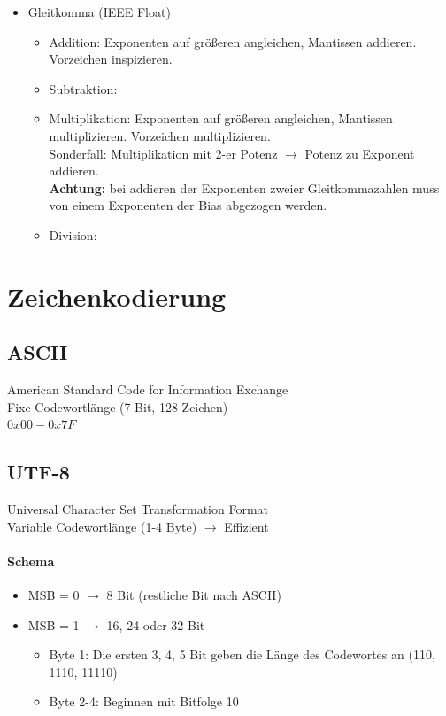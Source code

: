 \documentclass[6pt,a4paper]{scrartcl}
\renewcommand{\emph}[1]{\textsf{\textbf{#1}}}
\begin{document}
\begin{multicols*}{3}
\begin{itemize}
\begin{itemize}
\begin{enumerate}
		\end{enumerate}
	\end{itemize}
	\item Gleitkomma (IEEE Float)
	\begin{itemize}
		\item Addition: Exponenten auf größeren angleichen, Mantissen addieren. Vorzeichen inspizieren.\\
		\item Subtraktion:
		\item Multiplikation: Exponenten auf größeren angleichen, Mantissen multiplizieren. Vorzeichen multiplizieren.\\
		Sonderfall: Multiplikation mit 2-er Potenz $\rightarrow$ Potenz zu Exponent addieren.\\
		\emph{Achtung: } bei addieren der Exponenten zweier Gleitkommazahlen muss von einem Exponenten der Bias abgezogen werden.
		\item Division:
	\end{itemize}
\end{itemize}
\section{Zeichenkodierung}
	\subsection{ASCII}
	American Standard Code for Information Exchange \\
	Fixe Codewortlänge (7 Bit, 128 Zeichen)\\
	$0x00 - 0x7F$
	\subsection{UTF-8}
	Universal Character Set Transformation Format \\
	Variable Codewortlänge (1-4 Byte) $\rightarrow$ Effizient \\
	\paragraph{Schema}
	\begin{itemize}
	\item MSB = 0 $\rightarrow$ 8 Bit (restliche Bit nach ASCII)
	\item MSB = 1 $\rightarrow$ 16, 24 oder 32 Bit
	 \begin{itemize}

	\item Byte 1: Die ersten 3, 4, 5 Bit geben die Länge des Codewortes an (110, 1110, 11110)
	\item Byte 2-4: Beginnen mit Bitfolge 10
	\end{itemize}
	\end{itemize}

\end{multicols*}
\end{document}

